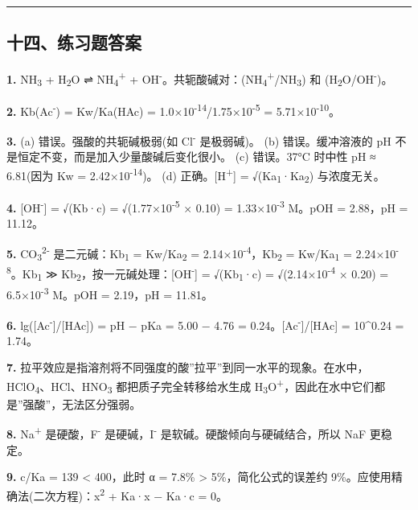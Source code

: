\begin{center}\rule{0.5\linewidth}{0.5pt}\end{center}

\subsection{十四、练习题答案}\label{ux5341ux56dbux7ec3ux4e60ux9898ux7b54ux6848}

\textbf{1.} NH\textsubscript{3} + H\textsubscript{2}O ⇌ NH\textsubscript{4}\textsuperscript{+} + OH\textsuperscript{-}。共轭酸碱对：(NH\textsubscript{4}\textsuperscript{+}/NH\textsubscript{3}) 和 (H\textsubscript{2}O/OH\textsuperscript{-})。

\textbf{2.} Kb(Ac\textsuperscript{-}) = Kw/Ka(HAc) = 1.0×10\textsuperscript{-14}/1.75×10\textsuperscript{-5} = 5.71×10\textsuperscript{-10}。

\textbf{3.}
(a) 错误。强酸的共轭碱极弱(如 Cl\textsuperscript{-} 是极弱碱)。
(b) 错误。缓冲溶液的 pH 不是恒定不变，而是加入少量酸碱后变化很小。
(c) 错误。37°C 时中性 pH ≈ 6.81(因为 Kw = 2.42×10\textsuperscript{-14})。
(d) 正确。{[}H\textsuperscript{+}{]} = √(Ka\textsubscript{1}·Ka\textsubscript{2}) 与浓度无关。

\textbf{4.} {[}OH\textsuperscript{-}{]} = √(Kb·c) = √(1.77×10\textsuperscript{-5} × 0.10) = 1.33×10\textsuperscript{-3} M。pOH = 2.88，pH = 11.12。

\textbf{5.} CO\textsubscript{3}\textsuperscript{2-} 是二元碱：Kb\textsubscript{1} = Kw/Ka\textsubscript{2} = 2.14×10\textsuperscript{-4}，Kb\textsubscript{2} = Kw/Ka\textsubscript{1} = 2.24×10\textsuperscript{-8}。Kb\textsubscript{1} ≫ Kb\textsubscript{2}，按一元碱处理：{[}OH\textsuperscript{-}{]} = √(Kb\textsubscript{1}·c) = √(2.14×10\textsuperscript{-4} × 0.20) = 6.5×10\textsuperscript{-3} M。pOH = 2.19，pH = 11.81。

\textbf{6.} lg({[}Ac\textsuperscript{-}{]}/{[}HAc{]}) = pH − pKa = 5.00 − 4.76 = 0.24。{[}Ac\textsuperscript{-}{]}/{[}HAc{]} = 10\^{}0.24 = 1.74。

\textbf{7.} 拉平效应是指溶剂将不同强度的酸''拉平''到同一水平的现象。在水中，HClO\textsubscript{4}、HCl、HNO\textsubscript{3} 都把质子完全转移给水生成 H\textsubscript{3}O\textsuperscript{+}，因此在水中它们都是''强酸''，无法区分强弱。

\textbf{8.} Na\textsuperscript{+} 是硬酸，F\textsuperscript{-} 是硬碱，I\textsuperscript{-} 是软碱。硬酸倾向与硬碱结合，所以 NaF 更稳定。

\textbf{9.} c/Ka = 139 \textless{} 400，此时 α = 7.8\% \textgreater{} 5\%，简化公式的误差约 9\%。应使用精确法(二次方程)：x\textsuperscript{2} + Ka·x − Ka·c = 0。

